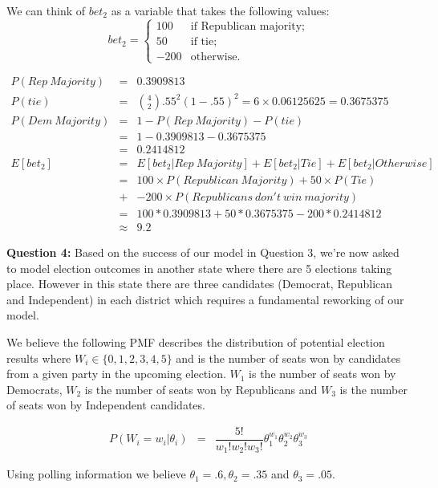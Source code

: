 \documentclass[11pt]{article}
\begin{document}
\begin{enumerate}
We can think of $bet_2$ as a variable that takes the following values:
\[ bet_2 = \left\{ \begin{array}{ll}
         100 & \mbox{if Republican majority};\\
          50 & \mbox{if tie};\\
        -200 & \mbox{otherwise}.\end{array} \right. \]
      
	\begin{eqnarray*}
	P(Rep \ Majority) &=& 0.3909813\\
	P(tie) &=& \binom{4}{2} .55^2 (1-.55)^{2} = 6 \times  0.06125625 =  0.3675375 \\
	P(Dem \ Majority) &=& 1 - P(Rep \ Majority) - P(tie)\\
	&=& 1 - 0.3909813 - 0.3675375 \\
	&=& 0.2414812 \\
	E[bet_2] &=& E[bet_2 | Rep \ Majority] + E[bet_2 | Tie] + E[bet_2 | Otherwise]\\
	&=& 100 \times P(Republican \ Majority) + 50 \times P(Tie)\\
	&+& -200 \times P(Republicans \ don't \ win \ majority)\\
	&=& 100*0.3909813 + 50*0.3675375 - 200*0.2414812\\
	&\approx&  9.2
	\end{eqnarray*}
\end{enumerate}

\textbf{Question 4:}
Based on the success of our model in Question 3, we're now asked to model election outcomes in another state where there are 5 elections taking place. However in this state there are three candidates (Democrat, Republican and Independent) in each district which requires a fundamental reworking of our model.

We believe the following PMF describes the distribution of potential election results where $W_i \in \{0,1,2,3,4,5\}$ and is the number of seats won by candidates from a given party in the upcoming election. $W_1$ is the number of seats won by Democrats, $W_2$ is the number of seats won by Republicans and $W_3$ is the number of seats won by Independent candidates.

\begin{eqnarray*}
P(W_i = w_i | \theta_i) &=& \dfrac{5!}{w_1! w_2! w_3!} \theta_1^{w_1} \theta_2^{w_2} \theta_3^{w_3}
\end{eqnarray*}

Using polling information we believe $\theta_1 = .6, \theta_2=.35$ and $\theta_3=.05$. 
\end{document}
